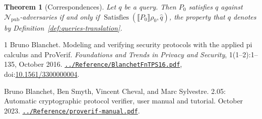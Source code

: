 \documentclass[11pt]{article}
\theoremstyle{definition}
\theoremstyle{plain}
\newtheorem{theorem}[definition]{Theorem}
\theoremstyle{remark}
\newcommand{\Satisfies}{\operatorname{Satisfies}}
\newcommand{\sem}[1]{\llbracket #1 \rrbracket}
\begin{document}
\begin{theorem}[Correspondences]\label{thm:corr}
Let $q$ be a query. Then $P_0$ satisfies $q$ against $\mathcal{N}_{\mathrm{pub}}$-adversaries if and only if $\Satisfies(\sem{P_0}\rho_0,\hat q)$, the property that $q$ denotes by Definition~\ref{def:queries-translation}.
\end{theorem}

\begin{thebibliography}{1}
Bruno Blanchet.
\newblock Modeling and verifying security protocols with the applied pi calculus and {ProVerif}.
\newblock \emph{Foundations and Trends in Privacy and Security}, 1(1--2):1--135, October 2016.
\newblock \href{file:../Reference/BlanchetFnTPS16.pdf}{\texttt{../Reference/BlanchetFnTPS16.pdf}},
doi:\href{https://doi.org/10.1561/3300000004}{10.1561/3300000004}.

Bruno Blanchet, Ben Smyth, Vincent Cheval, and Marc Sylvestre.
 2.05: Automatic cryptographic protocol verifier, user manual and tutorial.
\newblock October 2023.
\newblock \href{file:../Reference/proverif-manual.pdf}{\texttt{../Reference/proverif-manual.pdf}}.
\end{thebibliography}
\end{document}
